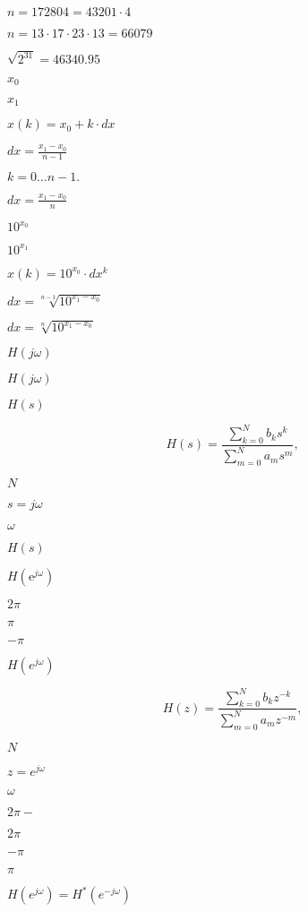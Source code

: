 \documentclass{article}
\begin{document}
$ n = 172804 = 43201 \cdot 4 $
\pagebreak

$ n = 13 \cdot 17 \cdot 23 \cdot 13 = 66079 $
\pagebreak

$\sqrt{2^{31}} = 46340.95$
\pagebreak

$x_0$
\pagebreak

$x_1$
\pagebreak

$x(k) = x_0 + k \cdot dx$
\pagebreak

$dx = \frac{x_1 - x_0}{n-1}$
\pagebreak

$k = 0 \ldots n-1.$
\pagebreak

$dx = \frac{x_1 - x_0}{n}$
\pagebreak

$10^{x_0}$
\pagebreak

$10^{x_1}$
\pagebreak

$x(k) = 10^{x_0} \cdot dx^k$
\pagebreak

$dx = \sqrt[n-1]{10^{x_1 - x_0}}$
\pagebreak

$dx = \sqrt[n]{10^{x_1 - x_0}}$
\pagebreak

$ H(j \omega) $
\pagebreak

$ H(j \omega)$
\pagebreak

$ H(s) $
\pagebreak

\[ H(s) = \frac {\sum_{k = 0}^{N} b_k s^k} {\sum_{m = 0}^{N} a_m s^m}, \]
\pagebreak

$ N $
\pagebreak

$ s = j \omega $
\pagebreak

$ \omega $
\pagebreak

$H(s)$
\pagebreak

$ H \left(\mathrm{e}^{j\omega} \right) $
\pagebreak

$ 2\pi $
\pagebreak

$ \pi $
\pagebreak

$ -\pi $
\pagebreak

$ H \left(e^{j \omega} \right)$
\pagebreak

\[ H(z) = \frac {\sum_{k = 0}^{N} b_k z^{-k}} {\sum_{m = 0}^{N} a_m z^{-m}}, \]
\pagebreak

$N$
\pagebreak

$z = e^{j \omega} $
\pagebreak

$\omega$
\pagebreak

$ 2 \pi-$
\pagebreak

$2 \pi$
\pagebreak

$-\pi$
\pagebreak

$ \pi$
\pagebreak

$ H \left(e^{j \omega} \right) = H^* \left(e^{-j \omega} \right)$
\pagebreak
\end{document}

